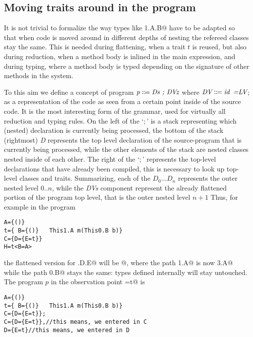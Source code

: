 \subsection{Moving traits around in the program}
It is not trivial to formalize the way types like \Q@This1.A.B@ %
have to be adapted so that when code is moved around in different depths of nesting the 
refereed classes stay the same.
This is needed during flattening, when a trait $t$ is reused, but also during reduction, when a method body is inlined in the main expression, and during typing, where a method body is typed depending on the signature of other methods in the system.

To this aim we define a concept of program 
$\textit{p}\Coloneqq\textit{Ds\Q{;} DVz}$
where 
$\textit{DV}\Coloneqq\textit{id\eq{LV}}$; as a representation of 
the code as seen from a certain point inside of the source code. It is the most interesting form of the grammar,
used for virtually all reduction and typing rules. On the left of the `$;$' is a stack representing which (nested) declaration is currently being processed,
 the bottom of the stack (rightmost) \textit{D} represents the top level declaration of the source-program that is currently being processed, while the other elements of the stack are nested classes nested inside of each other.
  The right of the `$;$' represents the top-level declarations that have already been compiled, this is necessary to look up top-level classes and traits.
Summarizing, each of the $\textit{D}_0\ldots\textit{D}_n$
represents the outer nested level $0..n$, while
the \textit{DVs} component represent the already flattened portion of the program top level, that is 
the outer nested level $n+1$
Thus, for example in the program
\begin{lstlisting}
A={()}
t={ B={()}   This1.A m(This0.B b)}
C={D={E=t}}
H=t<B=A>
\end{lstlisting}
the flattened version for \Q@C.D.E@ will be 
@, where the path
\Q@This1.A@ is now \Q@This3.A@ while the path \Q@This0.B@ stays the same: types defined internally will
stay untouched.
The program $p$ in the observation point \Q@E=t@ is
\begin{lstlisting}
A={()}
t={ B={()}   This1.A m(This0.B b)}
C={D={E=t}};
C={D={E=t}},//this means, we entered in C
D={E=t}//this means, we entered in D
\end{lstlisting}

